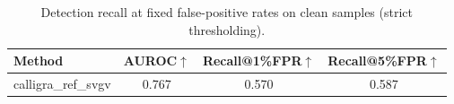 \begin{table}[t]
\centering
\small
\begin{tabular}{lccc}
\toprule
Method & AUROC$\uparrow$ & Recall@1\%FPR$\uparrow$ & Recall@5\%FPR$\uparrow$ \\
\midrule
calligra\_ref\_svgv & 0.767 & 0.570 & 0.587 \\
\bottomrule
\end{tabular}
\caption{Detection recall at fixed false-positive rates on clean samples (strict thresholding).}
\label{tab:detection_fpr_single}
\end{table}
